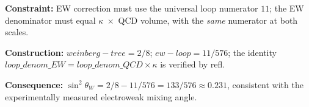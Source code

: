\documentclass[11pt,a4paper]{book}
\def\texttt#1{#1}%
\begin{document}
\medskip
\noindent
\textbf{Constraint:}
EW correction must use the universal loop numerator $11$; the EW denominator must
equal $\kappa \;\times$ QCD volume, with the \emph{same} numerator at both scales.

\noindent
\textbf{Construction:}
$\texttt{weinberg-tree} = 2/8$; $\texttt{ew-loop} = 11/576$; the identity
$\texttt{loop\_denom\_EW} = \texttt{loop\_denom\_QCD} \times \kappa$ is verified
by \texttt{refl}.

\noindent
\textbf{Consequence:}
$\sin^2\!\theta_W = 2/8 - 11/576 = 133/576 \approx 0.231$, consistent with the
experimentally measured electroweak mixing angle.

\begin{code}%
\>[0]\AgdaSpace{}%
\AgdaSymbol{:}\AgdaSpace{}%
\<%
\\
\>[0]\AgdaSpace{}%
\AgdaSymbol{=}\AgdaSpace{}%
%
\>[43]\<%
\\
%
\\[\AgdaEmptyExtraSkip]%
\>[0]\AgdaSpace{}%
\AgdaSymbol{:}\AgdaSpace{}%
\<%
\\
\>[0]\AgdaSpace{}%
\AgdaSymbol{=}\AgdaSpace{}%
%
\>[43]\<%
\\
%
\\[\AgdaEmptyExtraSkip]%
\>[0]\<%
\\
\>[0]\AgdaSpace{}%
\AgdaSymbol{:}\AgdaSpace{}%
\AgdaSpace{}%
\AgdaSpace{}%
\<%
\\
\>[0]\AgdaSpace{}%
\AgdaSymbol{=}\AgdaSpace{}%
\<%
\\
%
\\[\AgdaEmptyExtraSkip]%
\>[0]\AgdaSpace{}%
\AgdaSymbol{:}\AgdaSpace{}%
\AgdaSpace{}%
\AgdaSpace{}%
\<%
\\
\>[0]\AgdaSpace{}%
\AgdaSymbol{=}\AgdaSpace{}%
\<%
\\
%
\\[\AgdaEmptyExtraSkip]%

\end{code}
\end{document}
